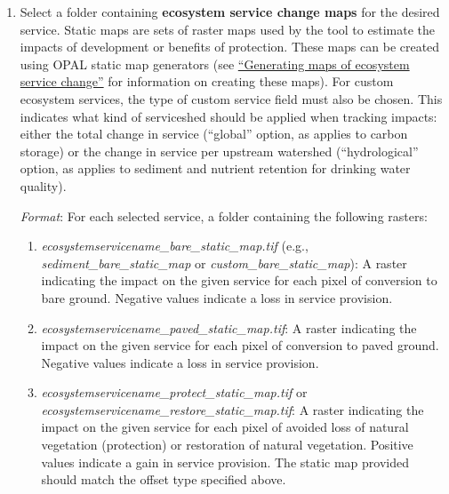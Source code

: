 \documentclass[11pt,letterpaper]{report}
\newenvironment{myenumerate}{%
	\edef\backupindent{\the\parindent}
	\enumerate
	\setlength{\parindent}{\backupindent}
		\setlist[enumerate,1]{label=(\arabic*)}
		\setlist[enumerate,2]{label=(\arabic*)}
}{\endenumerate}
\begin{document}
\begin{myenumerate}
\begin{enumerate}[label=\alph*.]
				\item Select a folder containing \textbf{ecosystem service change maps} for the desired service. Static maps are sets of raster maps used by the tool to estimate the impacts of development or benefits of protection. These maps can be created using OPAL static map generators (see \hyperref[ch:maps]{``Generating maps of ecosystem service change''} for information on creating these maps). For custom ecosystem services, the type of custom service field must also be chosen. This indicates what kind of serviceshed should be applied when tracking impacts: either the total change in service (``global'' option, as applies to carbon storage) or the change in service per upstream watershed (``hydrological'' option, as applies to sediment and nutrient retention for drinking water quality).\\
				
				\begin{adjustwidth}{0.25in}{}
					{\em Format}: For each selected service, a folder containing the following rasters:
				\end{adjustwidth}
				
				\begin{enumerate}[label=(\arabic*),leftmargin=0.5in,labelindent=!,itemindent=-0.02in]
					\item {\em ecosystemservicename\_{}bare\_{}static\_{}map.tif} (e.g., {\em sediment\_{}bare\_{}static\_{}map} or {\em custom\_{}bare\_{}static\_{}map}): A raster indicating the impact on the given service for each pixel of conversion to bare ground. Negative values indicate a loss in service provision.
					
					\item {\em ecosystemservicename\_{}paved\_{}static\_{}map.tif}: A raster indicating the impact on the given service for each pixel of conversion to paved ground. Negative values indicate a loss in service provision.
					
					\item {\em ecosystemservicename\_{}protect\_{}static\_{}map.tif} or {\em ecosystemservicename\_{}restore\_{}static\_{}map.tif}: A raster indicating the impact on the given service for each pixel of avoided loss of natural vegetation (protection) or restoration of natural vegetation. Positive values indicate a gain in service provision. The static map provided should match the offset type specified above. 
					

\end{enumerate}
\end{enumerate}
\end{myenumerate}
\end{document}
